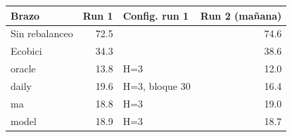 \begin{tabular}{lrlr}
\toprule
Brazo & Run 1 & Config. run 1 & Run 2 (mañana) \\
\midrule
Sin rebalanceo & 72.5 &  & 74.6 \\
Ecobici & 34.3 &  & 38.6 \\
oracle & 13.8 & H=3 & 12.0 \\
daily & 19.6 & H=3, bloque 30 & 16.4 \\
ma & 18.8 & H=3 & 19.0 \\
model & 18.9 & H=3 & 18.7 \\
\bottomrule
\end{tabular}
